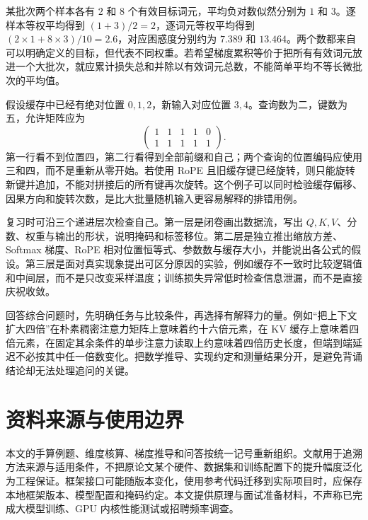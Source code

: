 \documentclass[UTF8,12pt,a4paper,fontset=fandol]{ctexart}
\begin{document}
\begin{example}[逐词元平均与逐样本平均为什么不同]
某批次两个样本各有 $2$ 和 $8$ 个有效目标词元，平均负对数似然分别为 $1$ 和 $3$。逐样本等权平均得到 $(1+3)/2=2$，逐词元等权平均得到 $(2\times1+8\times3)/10=2.6$，对应困惑度分别约为 $7.389$ 和 $13.464$。两个数都来自可以明确定义的目标，但代表不同权重。若希望梯度累积等价于把所有有效词元放进一个大批次，就应累计损失总和并除以有效词元总数，不能简单平均不等长微批次的平均值。
\end{example}

\begin{example}[增量解码的掩码与位置核对]
假设缓存中已经有绝对位置 $0,1,2$，新输入对应位置 $3,4$。查询数为二，键数为五，允许矩阵应为
\[
\begin{pmatrix}1&1&1&1&0\\1&1&1&1&1\end{pmatrix}.
\]
第一行看不到位置四，第二行看得到全部前缀和自己；两个查询的位置编码应使用三和四，而不是重新从零开始。若使用 RoPE 且旧缓存键已经旋转，则只能旋转新键并追加，不能对拼接后的所有键再次旋转。这个例子可以同时检验缓存偏移、因果方向和旋转次数，是比大批量随机输入更容易解释的排错用例。
\end{example}

复习时可沿三个递进层次检查自己。第一层是闭卷画出数据流，写出 $Q,K,V$、分数、权重与输出的形状，说明掩码和标签移位。第二层是独立推出缩放方差、Softmax 梯度、RoPE 相对位置恒等式、参数数与缓存大小，并能说出各公式的假设。第三层是面对真实现象提出可区分原因的实验，例如缓存不一致时比较逻辑值和中间层，而不是只改变采样温度；训练损失异常低时检查信息泄漏，而不是直接庆祝收敛。

回答综合问题时，先明确任务与比较条件，再选择有解释力的量。例如“把上下文扩大四倍”在朴素稠密注意力矩阵上意味着约十六倍元素，在 KV 缓存上意味着四倍元素，在固定其余条件的单步注意力读取上约意味着四倍历史长度，但端到端延迟不必按其中任一倍数变化。把数学推导、实现约定和测量结果分开，是避免背诵结论却无法处理追问的关键。

\section{资料来源与使用边界}
\label{sec:tr-sources}

本文的手算例题、维度核算、梯度推导和问答按统一记号重新组织。文献用于追溯方法来源与适用条件，不把原论文某个硬件、数据集和训练配置下的提升幅度泛化为工程保证。框架接口可能随版本变化，使用参考代码迁移到实际项目时，应保存本地框架版本、模型配置和掩码约定。本文提供原理与面试准备材料，不声称已完成大模型训练、GPU 内核性能测试或招聘频率调查。
\end{document}
